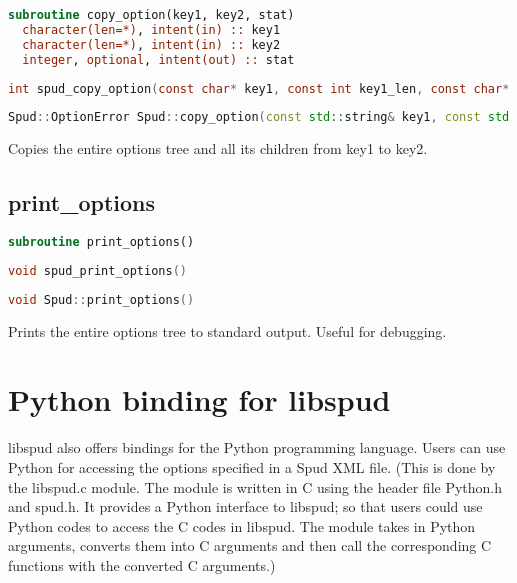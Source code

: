 \documentclass[a4paper, 11pt]{book}
\begin{document}
\begin{lstlisting}[language=fortran]
subroutine copy_option(key1, key2, stat)
  character(len=*), intent(in) :: key1
  character(len=*), intent(in) :: key2
  integer, optional, intent(out) :: stat
\end{lstlisting}

\begin{lstlisting}[language=C]
int spud_copy_option(const char* key1, const int key1_len, const char* key2, const int key2_len)
\end{lstlisting}

\begin{lstlisting}[language=C++]
Spud::OptionError Spud::copy_option(const std::string& key1, const std::string& key2)
\end{lstlisting}

Copies the entire options tree and all its children from key1 to key2.

\subsection{print\_options}

\begin{lstlisting}[language=fortran]
subroutine print_options()
\end{lstlisting}

\begin{lstlisting}[language=C]
void spud_print_options()
\end{lstlisting}

\begin{lstlisting}[language=C++]
void Spud::print_options()
\end{lstlisting}

Prints the entire options tree to standard output. Useful for debugging.

\section{Python binding for libspud}

libspud also offers bindings for the Python programming language.  Users can use Python for accessing the options specified in a Spud XML file.  (This is done by the libspud.c module.  The module is written in C using the header file Python.h and spud.h.  It provides a Python interface to libspud; so that users could use Python codes to access the C codes in libspud.  The module takes in Python arguments, converts them into C arguments and then call the corresponding C functions with the converted C arguments.)
\end{document}
